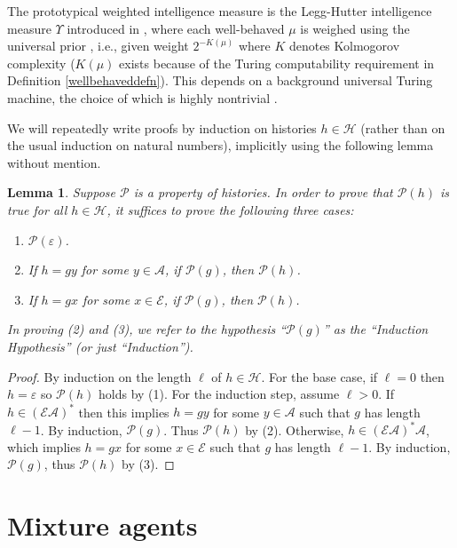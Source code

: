 \documentclass[twoside]{article}
\newtheorem{lemma}[theorem]{Lemma}
\begin{document}
The prototypical weighted intelligence measure is the Legg-Hutter intelligence
measure $\Upsilon$ introduced in \cite{legg2007universal},
where each well-behaved $\mu$ is
weighed using the universal prior \cite{li2008introduction}, i.e.,
given weight $2^{-K(\mu)}$
where $K$ denotes Kolmogorov complexity ($K(\mu)$ exists because of the Turing
computability requirement in Definition \ref{wellbehaveddefn}).
This depends on a background universal
Turing machine, the choice of which is highly nontrivial
\cite{leike2015bad}.

We will repeatedly write proofs by induction on histories $h\in\mathcal H$
(rather than on the usual induction on natural
numbers), implicitly using the following lemma without mention.

\begin{lemma}
\label{trivialinductionlemma}
    Suppose $\mathscr P$ is a property of histories. In order to prove
    that $\mathscr P(h)$ is true
    for all $h\in\mathcal H$, it suffices to prove the following three cases:
    \begin{enumerate}
        \item $\mathscr P(\varepsilon)$.
        \item If $h=gy$ for some $y\in\mathcal A$, if $\mathscr P(g)$, then $\mathscr P(h)$.
        \item If $h=gx$ for some $x\in\mathcal E$, if $\mathscr P(g)$, then $\mathscr P(h)$.
    \end{enumerate}
    In proving (2) and (3), we refer to the hypothesis ``$\mathscr P(g)$'' as the
    ``Induction Hypothesis'' (or just ``Induction'').
\end{lemma}

\begin{proof}
    By induction on the length $\ell$ of $h\in\mathcal H$.
    For the base case, if $\ell=0$ then $h=\varepsilon$ so $\mathscr P(h)$ holds by (1).
    For the induction step, assume $\ell>0$.
    If $h\in(\mathcal E\mathcal A)^*$ then this implies
    $h=gy$ for some $y\in\mathcal A$ such that $g$ has length $\ell-1$.
    By induction, $\mathscr P(g)$. Thus $\mathscr P(h)$ by (2).
    Otherwise, $h\in(\mathcal E\mathcal A)^*\mathcal A$, which implies
    $h=gx$ for some $x\in\mathcal E$ such that $g$ has length $\ell-1$.
    By induction, $\mathscr P(g)$, thus $\mathscr P(h)$ by (3).
\end{proof}

\section{Mixture agents}
\end{document}
